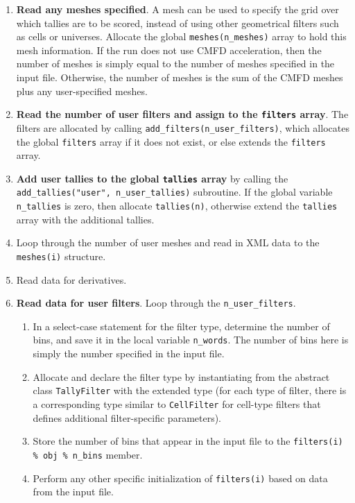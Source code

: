 \documentclass[10pt]{article}
\numberwithin{equation}{section} %
\begin{document}
\begin{enumerate}
\item {\bf Read any meshes specified}. A mesh can be used to specify the grid over which tallies are to be scored, instead of using other geometrical filters such as cells or universes. Allocate the global {\tt meshes(n\_meshes)} array to hold this mesh information. If the run does not use CMFD acceleration, then the number of meshes is simply equal to the number of meshes specified in the input file. Otherwise, the number of meshes is the sum of the CMFD meshes plus any user-specified meshes.  
\item {\bf Read the number of user filters and assign to the {\tt filters} array}. The filters are allocated by calling {\tt add\_filters(n\_user\_filters)}, which allocates the global {\tt filters} array if it does not exist, or else extends the {\tt filters} array.
\item {\bf Add user tallies to the global {\tt tallies} array} by calling the {\tt add\_tallies("user", n\_user\_tallies)} subroutine. If the global variable {\tt n\_tallies} is zero, then allocate {\tt tallies(n)}, otherwise extend the {\tt tallies} array with the additional tallies.
\item Loop through the number of user meshes and read in XML data to the {\tt meshes(i)} structure. 
\item Read data for derivatives. 
\item {\bf Read data for user filters}. Loop through the {\tt n\_user\_filters}.

	\begin{enumerate}
	\item In a select-case statement for the filter type, determine the number of bins, and save it in the local variable {\tt n\_words}. The number of bins here is simply the number specified in the input file.
	\item Allocate and declare the filter type by instantiating from the abstract class {\tt TallyFilter} with the extended type (for each type of filter, there is a corresponding type similar to {\tt CellFilter} for cell-type filters that defines additional filter-specific parameters).
	\item Store the number of bins that appear in the input file to the {\tt filters(i) \% obj \% n\_bins} member. 
	\item Perform any other specific initialization of {\tt filters(i)} based on data from the input file. 
	\end{enumerate}
	

\end{enumerate}
\end{document}

